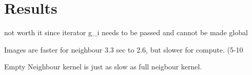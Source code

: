 \documentclass[final]{report}
\begin{document}
\chapter{Results}



not worth it since iterator g\_i needs to be passed and cannot be made global

Images are faster for neighbour 3.3 sec to 2.6, but slower for compute. (5-10%

 Empty Neighbour kernel is just as slow as full neigbour kernel.
\end{document}
